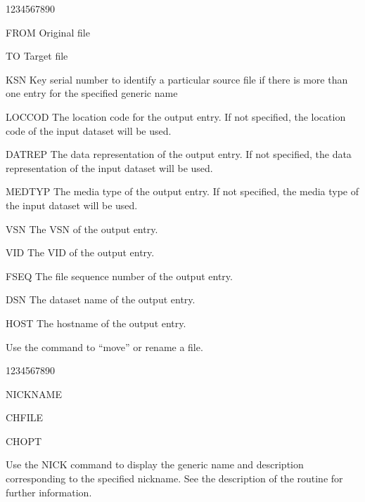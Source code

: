 \Sbox{MV}{MV}{FROM TO [KSN] [LOCCOD DATREP MEDTYP VSN VID FSEQ DSN HOST}
\begin{DLtt}{1234567890}
\item[FROM]Original file
\item[TO]Target file
\item[KSN]Key serial number to identify a particular source file if
there is more than one entry for the specified generic name
\item[LOCCOD]The location code for the output entry. 
If not specified, the location code of the input dataset will be used.
\item[DATREP]The data representation of the output entry.
If not specified, the data representation of the input dataset will be used.
\item[MEDTYP]The media type of the output entry.
If not specified, the media type of the input dataset will be used.
\item[VSN]The VSN of the output entry.
\item[VID]The VID of the output entry.
\item[FSEQ]The file sequence number of the output entry.
\item[DSN]The dataset name of the output entry.
\item[HOST]The hostname of the output entry.
\end{DLtt}
Use the  command to ``move'' or rename a file.
\begin{DLtt}{1234567890}
\item[NICKNAME]
\item[CHFILE]
\item[CHOPT]
\end{DLtt}
Use the NICK command to display the generic name and description
corresponding to the specified nickname. See the description
of the  routine for further information.

